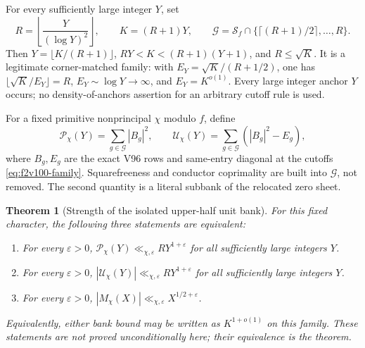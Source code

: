\documentclass[11pt]{article}
\newtheorem{theorem}{Theorem}[section]
\theoremstyle{definition}
\theoremstyle{remark}
\begin{document}
For every sufficiently large integer \(Y\), set
\begin{equation}
 R=\left\lfloor\frac{Y}{(\log Y)^2}\right\rfloor,
 \qquad K=(R+1)Y,\qquad
 \mathcal G=\mathcal S_f\cap
                  \{\lceil(R+1)/2\rceil,\ldots,R\}.
 \label{eq:f2v100-family}
\end{equation}
Then \(Y=\lfloor K/(R+1)\rfloor\), \(RY<K<(R+1)(Y+1)\),
and \(R\le\sqrt K\).  It is a legitimate corner-matched family:
with \(E_Y=\sqrt K/(R+1/2)\), one has
\(\lfloor\sqrt K/E_Y\rfloor=R\), \(E_Y\sim\log Y\to\infty\),
and \(E_Y=K^{o(1)}\).  Every large integer anchor \(Y\) occurs;
no density-of-anchors assertion for an arbitrary cutoff rule is used.

For a fixed primitive nonprincipal \(\chi\) modulo \(f\), define
\begin{equation}
 \mathcal P_\chi(Y)=\sum_{g\in\mathcal G}|B_g|^2,\qquad
 \mathcal U_\chi(Y)=\sum_{g\in\mathcal G}(|B_g|^2-E_g),
 \label{eq:f2v100-PU}
\end{equation}
where \(B_g,E_g\) are the exact V96 rows and same-entry diagonal
at the cutoffs \eqref{eq:f2v100-family}.  Squarefreeness and conductor
coprimality are built into \(\mathcal G\), not removed.
The second quantity is a literal subbank of the relocated zero sheet.

\begin{theorem}[Strength of the isolated upper-half unit bank]
\label{thm:f2v100-unit-equivalence}
For this fixed character, the following three statements are equivalent:
\begin{enumerate}[label=\textup{(\roman*)}]
\item For every \(\varepsilon>0\),
\(\mathcal P_\chi(Y)\ll_{\chi,\varepsilon}RY^{1+\varepsilon}\)
for all sufficiently large integers \(Y\).
\item For every \(\varepsilon>0\),
\(|\mathcal U_\chi(Y)|\ll_{\chi,\varepsilon}RY^{1+\varepsilon}\)
for all sufficiently large integers \(Y\).
\item For every \(\varepsilon>0\),
\(|M_\chi(X)|\ll_{\chi,\varepsilon}X^{1/2+\varepsilon}\).
\end{enumerate}
Equivalently, either bank bound may be written as
\(K^{1+o(1)}\) on this family.  These statements are not proved
unconditionally here; their equivalence is the theorem.
\end{theorem}
\end{document}
